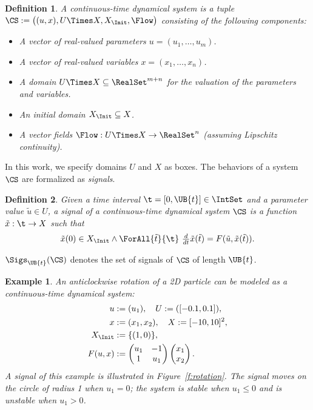 \documentclass[paper]{ieice}
\newtheorem{definition}{Definition}
\newtheorem{example}{Example}
\begin{document}
\begin{definition}
A \emph{continuous-time dynamical system} is a tuple 
$\CS :=\bigl( (u,x), U\Times X, X_\Init, \Flow \bigr)$
consisting of the following components:
\begin{itemize}
\item A vector of real-valued \emph{parameters} $u = (u_1,\ldots,u_m)$.
\item A vector of real-valued \emph{variables} $x = (x_1,\ldots,x_n)$.
\item A \emph{domain} $U \Times X \subseteq \RealSet^{m+n}$ for the valuation of the parameters and variables.
\item An \emph{initial domain} $X_\Init \subseteq X$.
\item A \emph{vector fields} $\Flow : U \Times X \to \RealSet^n$ (assuming Lipschitz continuity).
\end{itemize}
\end{definition}
In this work, we specify domains $U$ and $X$ as boxes.
The behaviors of a system $\CS$ are formalized as \emph{signals}.
\begin{definition}
	Given a time interval $\t = [0,\UB{t}] \in \IntSet$ and a parameter value $\tilde{u} \in U$,
	a \emph{signal} of a continuous-time dynamical system $\CS$ is a function $\tilde{x} : \t \to X$ such that
    \begin{gather*}
		\tilde{x}(0) \in X_\Init \land 
\ForAll{\tilde{t}}{\t} ~ \tfrac{d}{dt}\tilde{x}(\tilde{t}) = F(\tilde{u}, \tilde{x}(\tilde{t})).
    \end{gather*}
\end{definition}
$\Sigs_{\UB{t}}(\CS)$ denotes the set of signals of $\CS$ of length $\UB{t}$.

\begin{example} \label{ex:rotation}
	An anticlockwise rotation of a 2D particle can be modeled as a continuous-time dynamical system:
	\begin{align*}
		u &:= (u_1), \quad U := ([-0.1,0.1]), \\
		x &:= (x_1,x_2), \quad X := [-10,10]^2, \\
		X_\Init &:= \{(1, 0)\}, \\
		F(u,x) &:= \begin{pmatrix}
		u_1 & -1 \\
		1 & u_1
		\end{pmatrix}
		\begin{pmatrix}
			x_1 \\ x_2
		\end{pmatrix}.
	\end{align*}
A signal of this example is illustrated in Figure~\ref{f:rotation}.
The signal moves on the circle of radius 1 when $u_1 = 0$; the system is stable when $u_1 \leq 0$ and is unstable when $u_1 > 0$.
\end{example}
\end{document}
